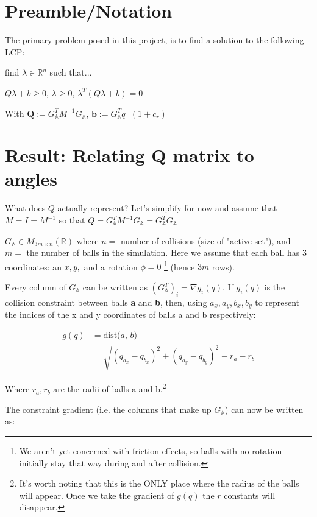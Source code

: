 \documentclass[12pt]{article}
\newcommand{\GA}{G_{\mathbb{A}}}
\newcommand{\dist}[2]{\text{dist(} #1 \text{, } #2 \text{)}}
\begin{document}
\section{Preamble/Notation}

The primary problem posed in this project, is to find a solution to the following LCP:

find $\lambda \in \mathbb{R}^n$ such that...

$Q\lambda + b \geq 0$, $\lambda \geq 0$, $\lambda^T (Q\lambda + b) = 0$

With
$\mathbf{Q} := \GA^T M^{-1} \GA$,
$\mathbf{b} := \GA^T \dot{q}^- (1 + c_r)$


\section{Result: Relating Q matrix to angles}

What does $Q$ actually represent? Let's simplify for now and assume that $M = I = M^{-1}$
so that $Q = \GA^T M^{-1} \GA = \GA^T \GA$

$\GA \in M_{3m \times n}(\mathbb{R})$
where $n = $ number of collisions (size of "active set"),
and $m = $ the number of balls in the simulation.
Here we assume that each ball has 3 coordinates: an $x, y,$ and a rotation $\phi = 0$
\footnote{
    We aren't yet concerned with friction effects,
    so balls with no rotation initially stay that way during and after collision.
}
(hence $3m$ rows).

Every column of $\GA$ can be written as $(\GA^T)_i = \nabla g_i(q)$.
If $g_i(q)$ is the collision constraint between balls \textbf{a} and \textbf{b},
then, using $a_x, a_y, b_x, b_y$ to represent the indices of the x and y coordinates
of balls a and b respectively:

\begin{align*}
    g(q)    &= \dist{a}{b} \\
            &= \sqrt{(q_{a_x} - q_{b_x})^2 + (q_{a_y} - q_{b_y})^2} - r_a - r_b
\end{align*}

Where $r_a, r_b$ are the radii of balls a and b.\footnote{It's worth noting that this is
the ONLY place where the radius of the balls will appear. Once we take the gradient of $g(q)$
the $r$ constants will disappear.}

The constraint gradient (i.e. the columns that make up $\GA$) can now be written as:
\end{document}
